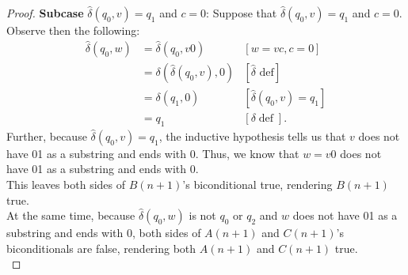 \documentclass[10pt]{article}
\begin{document}
\begin{enumerate}[label={}]
\begin{proof}
                  \textbf{Subcase }$\hat{\delta}\left(q_0, v\right)=q_1$ and $c=0$: Suppose that $\hat{\delta}\left(q_0, v\right)=q_1$ and $c=0$. Observe then the following:
                  $$
                        \begin{aligned}
                              \hat{\delta}\left(q_0, w\right) & =\hat{\delta}\left(q_0, v 0\right)                     & {[w=v c, c=0] }                                     \\
                                                              & =\delta\left(\hat{\delta}\left(q_0, v\right), 0\right) & {[\hat{\delta} \text { def}] }                      \\
                                                              & =\delta\left(q_1, 0\right)                             & {\left[\hat{\delta}\left(q_0, v\right)=q_1\right] } \\
                                                              & =q_1                                                   & {[\delta \operatorname{def}] . }
                        \end{aligned}
                  $$
                  Further, because $\hat{\delta}\left(q_0, v\right)=q_1$, the inductive hypothesis tells us that $v$ does not have 01 as a substring and ends with 0. Thus, we know that $w=v0$ does not have 01 as a substring and ends with 0.\\
                  This leaves both sides of $B(n+1)$'s biconditional true, rendering $B(n+1)$ true.\\
                  At the same time, because $\hat{\delta}\left(q_0, w\right)$ is not $q_0$ or $q_2$ and $w$ does not have 01 as a substring and ends with 0, both sides of $A(n+1)$ and $C(n+1)$'s biconditionals are false, rendering both $A(n+1)$ and $C(n+1)$ true.\\


\end{proof}
\end{enumerate}
\end{document}
